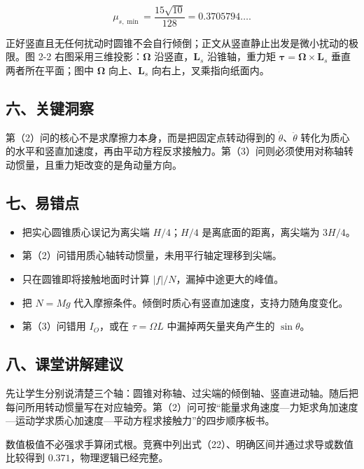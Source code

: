 \documentclass[12pt,a4paper,UTF8]{ctexart}
\newcommand{\tightlist}{\setlength{\itemsep}{0pt}\setlength{\parskip}{0pt}}
\begin{document}
\[\mu_{s,\min}=\frac{15\sqrt{10}}{128}=0.3705794\ldots.\]

正好竖直且无任何扰动时圆锥不会自行倾倒；正文从竖直静止出发是微小扰动的极限。图
2-2 右图采用三维投影：\(\boldsymbol\Omega\) 沿竖直，\(\boldsymbol L_s\)
沿锥轴，重力矩
\(\boldsymbol\tau=\boldsymbol\Omega\times\boldsymbol L_s\)
垂直两者所在平面；图中 \(\boldsymbol\Omega\) 向上、\(\boldsymbol L_s\)
向右上，叉乘指向纸面内。

\subsection{六、关键洞察}\label{ux516dux5173ux952eux6d1eux5bdf-1}

第（2）问的核心不是求摩擦力本身，而是把固定点转动得到的
\(\dot\theta\)、\(\ddot\theta\)
转化为质心的水平和竖直加速度，再由平动方程反求接触力。第（3）问则必须使用对称轴转动惯量，且重力矩改变的是角动量方向。

\subsection{七、易错点}\label{ux4e03ux6613ux9519ux70b9-1}

\begin{itemize}
\tightlist
\item
  把实心圆锥质心误记为离尖端 \(H/4\)；\(H/4\) 是离底面的距离，离尖端为
  \(3H/4\)。
\item
  第（2）问错用质心轴转动惯量，未用平行轴定理移到尖端。
\item
  只在圆锥即将接触地面时计算 \(|f|/N\)，漏掉中途更大的峰值。
\item
  把 \(N=Mg\) 代入摩擦条件。倾倒时质心有竖直加速度，支持力随角度变化。
\item
  第（3）问错用 \(I_O\)，或在 \(\tau=\Omega L\) 中漏掉两矢量夹角产生的
  \(\sin\theta\)。
\end{itemize}

\subsection{八、课堂讲解建议}\label{ux516bux8bfeux5802ux8bb2ux89e3ux5efaux8bae-1}

先让学生分别说清楚三个轴：圆锥对称轴、过尖端的倾倒轴、竖直进动轴。随后把每问所用转动惯量写在对应轴旁。第（2）问可按``能量求角速度---力矩求角加速度---运动学求质心加速度---平动方程求接触力''的四步顺序板书。

数值极值不必强求手算闭式根。竞赛中列出式（22）、明确区间并通过求导或数值比较得到
\(0.371\)，物理逻辑已经完整。
\end{document}
